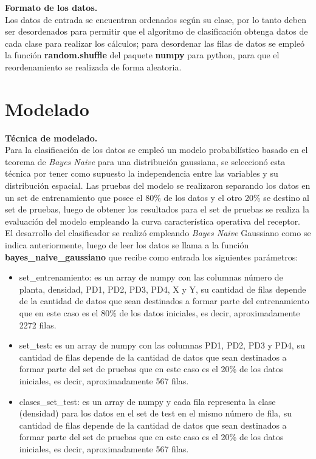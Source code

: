 \noindent
\textbf{Formato de los datos.}\\

Los datos de entrada se encuentran ordenados según su clase, por lo tanto deben ser desordenados para permitir que el algoritmo de clasificación obtenga datos de cada clase para realizar los cálculos; para desordenar las filas de datos se empleó la función \textbf{random.shuffle} del paquete \textbf{numpy} para python, para que el reordenamiento se realizada de forma aleatoria.\\

\section{Modelado}

\noindent
\textbf{Técnica de modelado.}\\

Para la clasificación de los datos se empleó un modelo probabilístico basado en el teorema de \textit{Bayes Naive}  para una distribución
gaussiana, se seleccionó esta técnica por tener como supuesto la independencia entre las variables y su distribución
espacial. Las pruebas del modelo se realizaron separando los datos en un set de entrenamiento que posee el 80\% de los
datos y el otro 20\% se destino al set de pruebas, luego de obtener los resultados para el set de pruebas se realiza la
evaluación del modelo empleando la curva característica operativa del receptor.\\

El desarrollo del clasificador se realizó empleando \textit{Bayes Naive} Gaussiano como se indica anteriormente, luego de leer los datos se llama a la función
\textbf{bayes\_naive\_gaussiano} que recibe como entrada los siguientes parámetros:
\begin{itemize}
	\item{set\_entrenamiento: es un array de numpy con las columnas número de planta, densidad, PD1, PD2, PD3, PD4, X y Y, su
	cantidad de filas depende de la cantidad de datos que sean destinados a formar parte del entrenamiento que en este caso es
	el 80\% de los datos iniciales, es decir, aproximadamente 2272 filas.}
	\item{set\_test: es un array de numpy con las columnas PD1, PD2, PD3 y PD4, su cantidad de filas depende de la cantidad de
	datos que sean destinados a formar parte del set de pruebas que en este caso es el 20\% de los datos iniciales, es decir,
	aproximadamente 567 filas.}
	\item{clases\_set\_test: es un array de numpy y cada fila representa la clase (densidad) para los datos en el set de test
	en el mismo número de fila, su cantidad de filas depende de la cantidad de datos que sean destinados a formar parte del set
	de pruebas que en este caso es el 20\% de los datos iniciales, es decir, aproximadamente 567 filas.\\}
\end{itemize}

